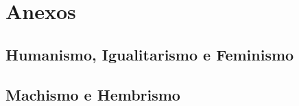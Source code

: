 \chapter{Anexos}

\section{Humanismo, Igualitarismo e Feminismo }


\section{Machismo e Hembrismo }


